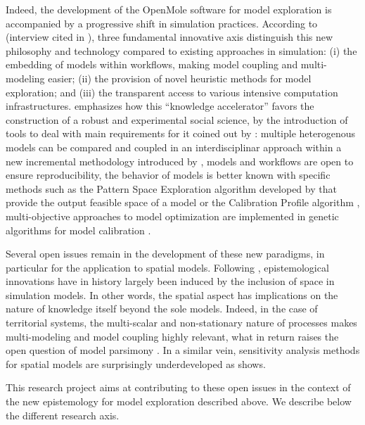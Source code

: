 Indeed, the development of the OpenMole software for model exploration \cite{reuillon2013openmole} is accompanied by a progressive shift in simulation practices. According to  (interview cited in \cite{raimbault2017applied}), three fundamental innovative axis distinguish this new philosophy and technology compared to existing approaches in simulation: (i) the embedding of models within workflows, making model coupling and multi-modeling easier; (ii) the provision of novel heuristic methods for model exploration; and (iii) the transparent access to various intensive computation infrastructures. \cite{banos2017knowledge} emphasizes how this ``knowledge accelerator'' favors the construction of a robust and experimental social science, by the introduction of tools to deal with main requirements for it coined out by \cite{banos2013pour}: multiple heterogenous models can be compared and coupled in an interdisciplinar approach within a new incremental methodology introduced by \cite{cottineau2015modular}, models and workflows are open to ensure reproducibility, the behavior of models is better known with specific methods such as the Pattern Space Exploration algorithm developed by \cite{10.1371/journal.pone.0138212} that provide the output feasible space of a model or the Calibration Profile algorithm \cite{reuillon2015}, multi-objective approaches to model optimization are implemented in genetic algorithms for model calibration \cite{schmitt2014half}.

Several open issues remain in the development of these new paradigms, in particular for the application to spatial models. Following \cite{varenne2017theories}, epistemological innovations have in history largely been induced by the inclusion of space in simulation models. In other words, the spatial aspect has implications on the nature of knowledge itself beyond the sole models. Indeed, in the case of territorial systems, the multi-scalar and non-stationary nature of processes makes multi-modeling and model coupling highly relevant, what in return raises the open question of model parsimony \cite{pumain2017urban}. In a similar vein, sensitivity analysis methods for spatial models are surprisingly underdeveloped as \cite{cottineau2017initial} shows.

This research project aims at contributing to these open issues in the context of the new epistemology for model exploration described above. We describe below the different research axis.



